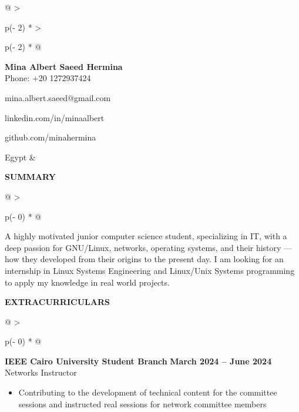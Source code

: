 \documentclass[a4paper]{article}
\begin{document}
\begin{longtable}[]{@{}
  >{\raggedright\arraybackslash}p{(\columnwidth - 2\tabcolsep) * }
  >{\raggedright\arraybackslash}p{(\columnwidth - 2\tabcolsep) * }@{}}
\textbf{\LARGE{Mina Albert Saeed Hermina}}
\vspace{1pt} \\ 
Phone: +20 1272937424

mina.albert.saeed@gmail.com

linkedin.com/in/minaalbert

github.com/minahermina

Egypt & \\
\end{longtable}
\vspace{-10pt}

\textbf{SUMMARY}
\vspace{-8pt}
\nopagebreak[4]
\begin{longtable}[]{@{}
  >{\raggedright\arraybackslash}p{(\columnwidth - 0\tabcolsep) * }@{}}
\toprule
\vspace{0pt}
A highly motivated junior computer science student, specializing in IT,
with a deep passion for GNU/Linux, networks, operating systems, and
their history --- how they developed from their origins to the present
day. I am looking for an internship in Linux Systems Engineering and
Linux/Unix Systems programming to apply my knowledge in real world
projects.
\end{longtable}
\vspace{-8pt}

\textbf{EXTRACURRICULARS}
\vspace{-7pt}
\nopagebreak[4]
\begin{longtable}[]{@{}
  >{\raggedright\arraybackslash}p{(\columnwidth - 0\tabcolsep) * }@{} }
\toprule\noalign{}
\vspace{0pt}
    \begin{minipage}[t]{\linewidth}\raggedright
        \textbf{IEEE Cairo University Student Branch}
        \hspace{27em}\textbf{March 2024 -- June 2024} \\
        Networks Instructor
        \vspace{.05em}
        \begin{itemize}
            \item
              Contributing to the development of technical content for the committee
              sessions and instructed real sessions for network committee members
        \end{itemize}
    \end{minipage} \\
\end{longtable}
\vspace{-10pt}
\end{document}
